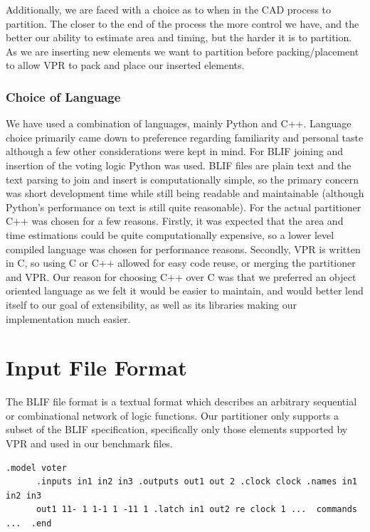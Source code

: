 \documentclass[12pt,final,oneside]{dwThesis} %
\begin{document}
   Additionally, we are faced with a choice as to when in the \gls{CAD} process
   to partition. The closer to the end of the process the more control we have,
   and the better our ability to estimate area and timing, but the harder it is
   to partition. As we are inserting new elements we want to partition before
   packing/placement to allow \gls{VPR} to pack and place our inserted
   elements.

   \subsubsection{Choice of Language} We have used a combination of languages,
   mainly Python and C++. Language choice primarily came down to preference
   regarding familiarity and personal taste although a few other considerations
   were kept in mind.  For \gls{BLIF} joining and insertion of the voting logic
   Python was used. \gls{BLIF} files are plain text and the text parsing to
   join and insert is computationally simple, so the primary concern was short
   development time while still being readable and maintainable (although
   Python's performance on text is still quite
   reasonable)\cite{LanguageBenchmark}.  For the actual partitioner C++ was
   chosen for a few reasons. Firstly, it was expected that the area and time
   estimations could be quite computationally expensive, so a lower level
   compiled language was chosen for performance
   reasons\cite{LanguageBenchmark}. Secondly, \gls{VPR} is written in C, so
   using C or C++ allowed for easy code reuse, or merging the partitioner and
   \gls{VPR}. Our reason for choosing C++ over C was that we preferred an
   object oriented language as we felt it would be easier to maintain, and
   would better lend itself to our goal of extensibility, as well as its
   libraries making our implementation much easier.

   \section{Input File Format}\label{secBlif} The \gls{BLIF} file format is a
   textual format which describes an arbitrary sequential or combinational
   network of logic functions\cite{BLIF}.  Our partitioner only supports a
   subset of the \gls{BLIF} specification, specifically only those elements
   supported by \gls{VPR} and used in our benchmark files.
   \begin{lstlisting}[caption=BLIF file layout, label=SampleBlif] .model voter
      .inputs in1 in2 in3 .outputs out1 out 2 .clock clock .names in1 in2 in3
      out1 11- 1 1-1 1 -11 1 .latch in1 out2 re clock 1 ...  commands ...  .end
   \end{lstlisting}
\end{document}
